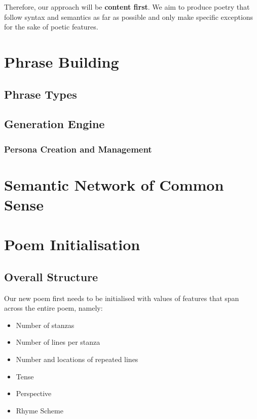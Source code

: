 Therefore, our approach will be \textbf{content first}. We aim to produce poetry that follow syntax and semantics as far as possible and only make specific exceptions for the sake of poetic features.


\section{Phrase Building}



\subsection{Phrase Types}

\subsection{Generation Engine}

\subsubsection{Persona Creation and Management}


\section{Semantic Network of Common Sense}


\section{Poem Initialisation}

\subsection{Overall Structure}
Our new poem first needs to be initialised with values of features that span across the entire poem, namely:
\begin{itemize}
\item{Number of stanzas}
\item{Number of lines per stanza}
\item{Number and locations of repeated lines}
\item{Tense}
\item{Perspective}
\item{Rhyme Scheme}
\end{itemize}

